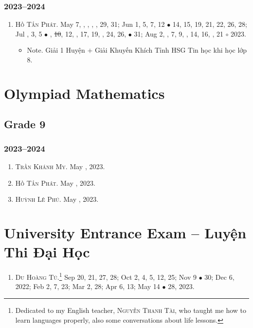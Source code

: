 \documentclass{article}
\begin{document}
\subsubsection{2023--2024}

\begin{enumerate}
	\item \textsc{Hồ Tấn Phát.} May 7, , , , , 29, 31; Jun 1, 5, 7, 12 $\bullet$ 14, 15, 19, 21, 22, 26, 28; Jul , 3, 5 $\bullet$ , \st{10}, 12, , 17, 19, , 24, 26,  $\bullet$ 31; Aug 2, , 7, 9, , 14, 16, , 21 $\circ$ 2023.
	\begin{itemize}
		\item {\sf Note.} Giải 1 Huyện $+$ Giải Khuyến Khích Tỉnh HSG Tin học khi học lớp 8.
	\end{itemize}
\end{enumerate}


\section{Olympiad Mathematics}

\subsection{Grade 9}

\subsubsection{2023--2024}

\begin{enumerate}
	\item \textsc{Trần Khánh My.} May , 2023.
	\item \textsc{Hồ Tấn Phát.} May , 2023.
	\item \textsc{Huỳnh Lê Phú.} May , 2023.
\end{enumerate}


\section{University Entrance Exam -- Luyện Thi Đại Học}

\begin{enumerate}
	\item \textsc{Du Hoàng Tú.}\footnote{Dedicated to my English teacher, \textsc{Nguyễn Thanh Tài}, who taught me how to learn languages properly, also some conversations about life lessons.} {\sf[In]} Sep 20, 21, 27, 28; Oct 2, 4, 5, 12, 25; Nov 9 $\bullet$ 30; Dec 6, 2022; Feb 2, 7, 23; Mar 2, 28; Apr 6, 13; May 14 $\bullet$ 28, 2023.
\end{enumerate}
\end{document}
